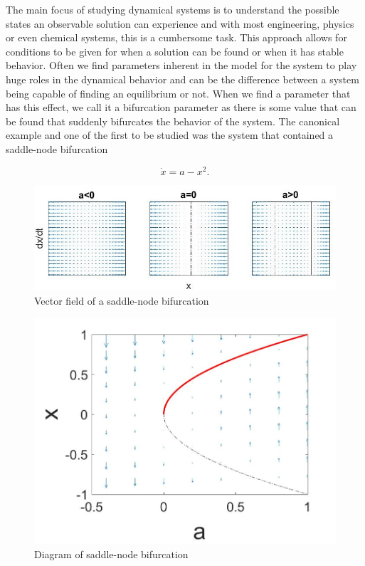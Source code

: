 The main focus of studying dynamical systems is to understand the possible states an observable solution can experience and with most engineering, physics or even chemical systems, this is a cumbersome task. This approach allows for conditions to be given for when a solution can be found or when it has stable behavior. Often we find parameters inherent in the model for the system to play huge roles in the dynamical behavior and can be the difference between a system being capable of finding an equilibrium or not. When we find a parameter that has this effect, we call it a bifurcation parameter as there is some value that can be found that suddenly bifurcates the behavior of the system. The canonical example and one of the first to be studied was the system that contained a saddle-node bifurcation

\begin{equation}\label{eq:intro_saddlenode}
\dot{x}=a-x^2.
\end{equation}

\begin{figure}[H]
\centering
\includegraphics[width=\linewidth]{intro/saddlenode.jpg}
\caption{Vector field of a saddle-node bifurcation}
\label{fig:intro_saddlenode}
\end{figure}


\begin{figure}[H]
\centering
\includegraphics[width=.7\linewidth]{intro/saddlenode_bif_diagram.jpg}
\caption{Diagram of saddle-node bifurcation}
\label{fig:intro_saddlenode_bif_diagram}
\end{figure}



